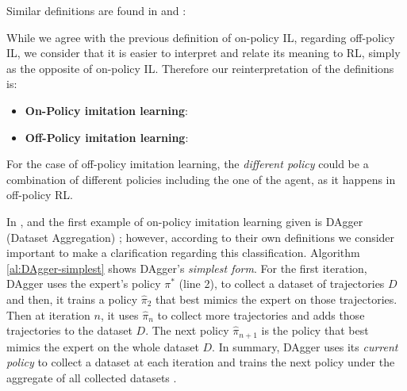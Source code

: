 \setlength{\parskip}{1em} 

Similar definitions are found in \cite{OtherLaskeydefinitions:2019} and \cite{Anotherdefinitionfromberkeley:2020}:

 
\setlength{\parskip}{1em} 

While we agree with the previous definition of on-policy IL, regarding off-policy IL, we consider that it is easier to interpret and relate its meaning to RL, simply as the opposite of on-policy IL. Therefore our reinterpretation of the definitions is:  

\begin{itemize}
  \item \textbf{On-Policy imitation learning}: 
  
  \item \textbf{Off-Policy imitation learning}: 
  


\end{itemize}

For the case of off-policy imitation learning, the \textit{different policy} could be a combination of different policies including the one of the agent, as it happens in off-policy RL.


In \cite{DBLP:journals/corr/LaskeyLHLMFG17}, \cite{OtherLaskeydefinitions:2019} and \cite{Osa:2018} the first example of on-policy imitation learning given is DAgger (Dataset  Aggregation) \cite{DAgger-Ross:2011}; however, according to their own definitions we consider important to make a clarification regarding this classification. Algorithm \ref{al:DAgger-simplest} shows DAgger's \textit{simplest form}. For the first iteration, DAgger uses the expert’s policy $\pi^*$ (line 2), to collect a dataset of trajectories $D$ and then, it trains a policy  $\hat{\pi}_2$ that best mimics the expert on those trajectories. Then at iteration $n$, it uses $\hat{\pi}_n$ to collect more trajectories and adds those trajectories to the dataset $D$. The next policy $\hat{\pi}_{n+1}$ is the policy that best mimics the expert on the whole dataset $D$. In summary, DAgger uses its \textit{current policy} to collect a dataset at each iteration and trains the next policy under the aggregate of all collected datasets \cite{DAgger-Ross:2011}.

